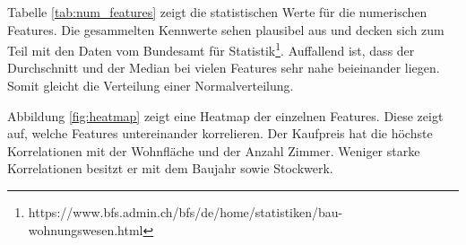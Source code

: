 Tabelle \ref{tab:num_features} zeigt die statistischen Werte für die numerischen Features. Die gesammelten Kennwerte sehen plausibel aus und decken sich zum Teil mit den Daten vom Bundesamt für Statistik\footnote{https://www.bfs.admin.ch/bfs/de/home/statistiken/bau-wohnungswesen.html}. Auffallend ist, dass der Durchschnitt und der Median bei vielen Features sehr nahe beieinander liegen. Somit gleicht die Verteilung einer Normalverteilung.

\begin{table}[h]
\centering
{}
\caption{Statistische Werte der numerischen Features}
\label{tab:num_features}
\end{table}

Abbildung \ref{fig:heatmap} zeigt eine Heatmap der einzelnen Features. Diese zeigt auf, welche Features  untereinander korrelieren. Der Kaufpreis hat die höchste Korrelationen mit der Wohnfläche und der Anzahl Zimmer. Weniger starke Korrelationen besitzt er mit dem Baujahr sowie Stockwerk.

